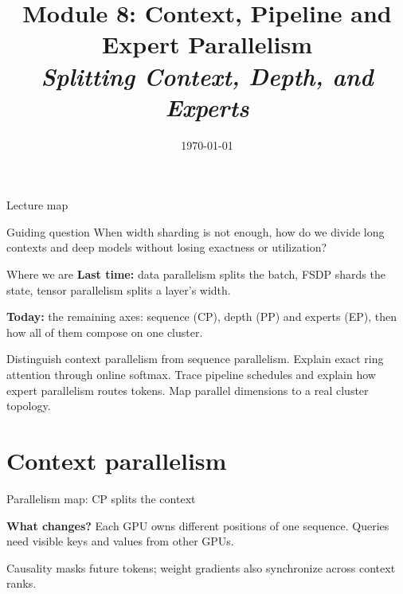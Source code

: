 \documentclass[handout]{beamer}
\title[TASLLM -- Module 8]{Module 8: Context, Pipeline and Expert Parallelism\\[4pt]
\normalsize\itshape Splitting Context, Depth, and Experts}
\date{\today}
\begin{document}
\makelecturetitle
\begin{frame}{Lecture map}
  \tableofcontents
  \vfill
  \begin{block}{Guiding question}
    When width sharding is not enough, how do we divide long contexts and deep models without losing exactness or utilization?
  \end{block}
\end{frame}

\begin{frame}{Where we are}
  \vspace{10pt}
  \textbf{\textcolor{accentdark}{Last time:}} data parallelism splits the batch, FSDP shards the state, tensor parallelism splits a layer's width.\par
  \vspace{10pt}
  \textbf{\textcolor{signaldark}{Today:}} the remaining axes: sequence (CP), depth (PP) and experts (EP), then how all of them compose on one cluster.
\end{frame}
\learninggoals
{Distinguish context parallelism from sequence parallelism.}
{Explain exact ring attention through online softmax.}
{Trace pipeline schedules and explain how expert parallelism routes tokens.}
{Map parallel dimensions to a real cluster topology.}

\section{Context parallelism}

\begin{frame}{Parallelism map: CP splits the context}
  \centering
  \ParallelLegend\par\vspace{6pt}
  \par\vspace{10pt}
  \begin{minipage}{.92\linewidth}\small\raggedright
    \textbf{What changes?}     Each GPU owns different positions of one sequence. Queries need visible keys and values from other GPUs.
  \end{minipage}\par\vspace{4pt}
  {\scriptsize Causality masks future tokens; weight gradients also synchronize across context ranks.}
\end{frame}
\end{document}
